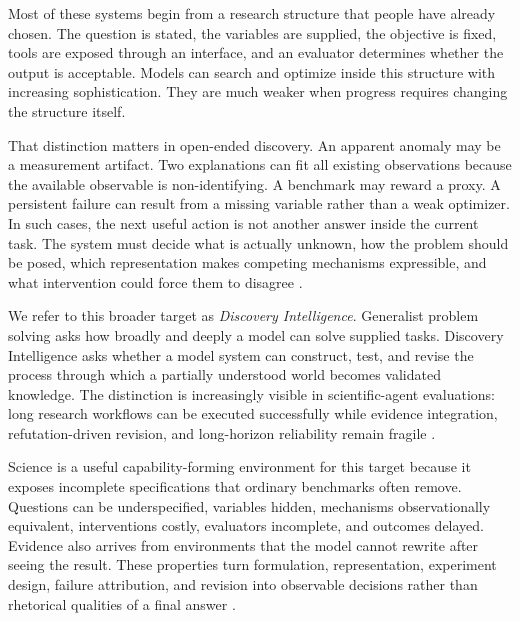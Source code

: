 \documentclass[11pt, a4paper, copyright]{google}
\begin{document}
Most of these systems begin from a research structure that people have already chosen. The question is stated, the variables are supplied, the objective is fixed, tools are exposed through an interface, and an evaluator determines whether the output is acceptable. Models can search and optimize inside this structure with increasing sophistication. They are much weaker when progress requires changing the structure itself.

That distinction matters in open-ended discovery. An apparent anomaly may be a measurement artifact. Two explanations can fit all existing observations because the available observable is non-identifying. A benchmark may reward a proxy. A persistent failure can result from a missing variable rather than a weak optimizer. In such cases, the next useful action is not another answer inside the current task. The system must decide what is actually unknown, how the problem should be posed, which representation makes competing mechanisms expressible, and what intervention could force them to disagree \citep{scholkopf2021causalrep,brunton2016sindy,udrescu2020aifeynman,chaloner1995bayesdesign}.

We refer to this broader target as \emph{Discovery Intelligence}. Generalist problem solving asks how broadly and deeply a model can solve supplied tasks. Discovery Intelligence asks whether a model system can construct, test, and revise the process through which a partially understood world becomes validated knowledge. The distinction is increasingly visible in scientific-agent evaluations: long research workflows can be executed successfully while evidence integration, refutation-driven revision, and long-horizon reliability remain fragile \citep{riosgarcia2026scientists,garikaparthi2026researchgym}.

Science is a useful capability-forming environment for this target because it exposes incomplete specifications that ordinary benchmarks often remove. Questions can be underspecified, variables hidden, mechanisms observationally equivalent, interventions costly, evaluators incomplete, and outcomes delayed. Evidence also arrives from environments that the model cannot rewrite after seeing the result. These properties turn formulation, representation, experiment design, failure attribution, and revision into observable decisions rather than rhetorical qualities of a final answer \citep{wang2023scientificdiscovery,zhang2025scientificmethod,swanson2025virtuallab,gottweis2026coscientist,ghareeb2026robin,lu2026aiscientist,trost2026spark}.
\end{document}
